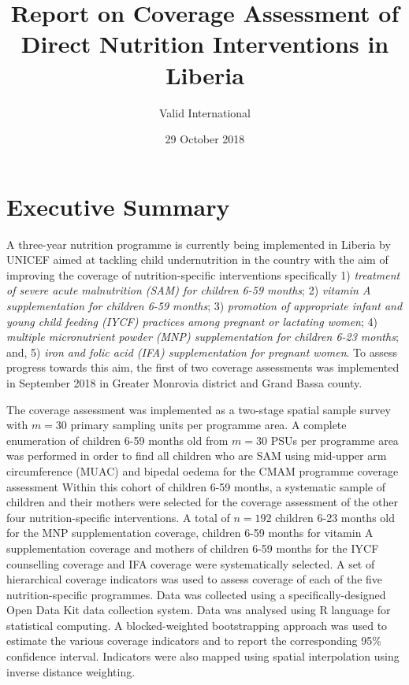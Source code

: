 \documentclass[12pt,a4paper]{article}
\title{\vspace{3.5in}Report on Coverage Assessment of Direct Nutrition
Interventions in Liberia}
\author{Valid International}
\date{29 October 2018}
\theoremstyle{definition}
\theoremstyle{definition}
\theoremstyle{definition}
\theoremstyle{remark}
\begin{document}
\maketitle

\newpage

{
\hypersetup{linkcolor=black}
\setcounter{tocdepth}{3}
\tableofcontents
}
\listoftables
\listoffigures
\newpage

\hypertarget{executive-summary}{%
\section{Executive Summary}\label{executive-summary}}

A three-year nutrition programme is currently being implemented in
Liberia by UNICEF aimed at tackling child undernutrition in the country
with the aim of improving the coverage of nutrition-specific
interventions specifically 1) \emph{treatment of severe acute
malnutrition (SAM) for children 6-59 months}; 2) \emph{vitamin A
supplementation for children 6-59 months}; 3) \emph{promotion of
appropriate infant and young child feeding (IYCF) practices among
pregnant or lactating women}; 4) \emph{multiple micronutrient powder
(MNP) supplementation for children 6-23 months}; and, 5) \emph{iron and
folic acid (IFA) supplementation for pregnant women}. To assess progress
towards this aim, the first of two coverage assessments was implemented
in September 2018 in Greater Monrovia district and Grand Bassa county.

The coverage assessment was implemented as a two-stage spatial sample
survey with \(m = 30\) primary sampling units per programme area. A
complete enumeration of children 6-59 months old from \(m = 30\) PSUs
per programme area was performed in order to find all children who are
SAM using mid-upper arm circumference (MUAC) and bipedal oedema for the
CMAM programme coverage assessment Within this cohort of children 6-59
months, a systematic sample of children and their mothers were selected
for the coverage assessment of the other four nutrition-specific
interventions. A total of \(n = 192\) children 6-23 months old for the
MNP supplementation coverage, children 6-59 months for vitamin A
supplementation coverage and mothers of children 6-59 months for the
IYCF counselling coverage and IFA coverage were systematically selected.
A set of hierarchical coverage indicators was used to assess coverage of
each of the five nutrition-specific programmes. Data was collected using
a specifically-designed Open Data Kit data collection system. Data was
analysed using R language for statistical computing. A blocked-weighted
bootstrapping approach was used to estimate the various coverage
indicators and to report the corresponding 95\% confidence interval.
Indicators were also mapped using spatial interpolation using inverse
distance weighting.
\end{document}

